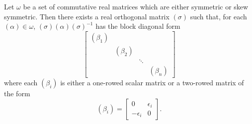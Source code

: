 Let $\omega$ be a set of commutative real matrices which are either symmetric or skew symmetric. Then there exists a real orthogonal matrix $(\sigma)$ such that, for each $(\alpha) \in \omega$, $(\sigma)(\alpha)(\sigma)^{-1}$ has the block diagonal form
$$\begin{bmatrix}
(\beta_1) & & \\
& (\beta_2) & \\
& & \ddots \\
& & & (\beta_n)
\end{bmatrix}$$
where each $(\beta_i)$ is either a one-rowed scalar matrix or a two-rowed matrix of the form
$$(\beta_i) = \begin{bmatrix} 0 & \epsilon_i \\ -\epsilon_i & 0 \end{bmatrix}.$$
